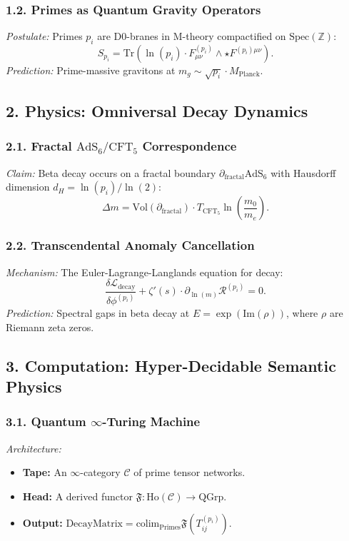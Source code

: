 \documentclass{article}
\theoremstyle{plain}
\newcommand{\Spec}{\text{Spec}}
\newcommand{\Ho}{\text{Ho}}
\newcommand{\QGrp}{\text{QGrp}}
\newcommand{\Tr}{\text{Tr}}
\newcommand{\colim}{\text{colim}}
\newcommand{\Vol}{\text{Vol}}
\newcommand{\DecayMatrix}{\text{DecayMatrix}}
\newcommand{\AdS}{\text{AdS}}
\newcommand{\CFT}{\text{CFT}}
\begin{document}
\subsubsection*{1.2. Primes as Quantum Gravity Operators}
\emph{Postulate:} Primes $p_i$ are D0-branes in M-theory compactified on $\Spec(\mathbb{Z})$:
\begin{equation}
S_{p_i} = \Tr\left(\ln(p_i) \cdot F_{\mu\nu}^{(p_i)} \wedge \star F^{(p_i)\mu\nu}\right).
\end{equation}
\emph{Prediction:} Prime-massive gravitons at $m_g \sim \sqrt{p_i} \cdot M_{\text{Planck}}$.

\subsection*{2. Physics: Omniversal Decay Dynamics}
\subsubsection*{2.1. Fractal $\AdS_6/\CFT_5$ Correspondence}
\emph{Claim:} Beta decay occurs on a fractal boundary $\partial_{\text{fractal}}\AdS_6$ with Hausdorff dimension $d_H = \ln(p_i)/\ln(2)$:
\begin{equation}
\Delta m = \Vol(\partial_{\text{fractal}}) \cdot T_{\CFT_5} \ln\left(\frac{m_0}{m_e}\right).
\end{equation}

\subsubsection*{2.2. Transcendental Anomaly Cancellation}
\emph{Mechanism:} The Euler-Lagrange-Langlands equation for decay:
\begin{equation}
\frac{\delta \mathcal{L}_{\text{decay}}}{\delta \phi^{(p_i)}} + \zeta'(s) \cdot \partial_{\ln(m)} \mathcal{R}^{(p_i)} = 0.
\end{equation}
\emph{Prediction:} Spectral gaps in beta decay at $E = \exp(\text{Im}(\rho))$, where $\rho$ are Riemann zeta zeros.

\subsection*{3. Computation: Hyper-Decidable Semantic Physics}
\subsubsection*{3.1. Quantum $\infty$-Turing Machine}
\emph{Architecture:}
\begin{itemize}
\item \textbf{Tape:} An $\infty$-category $\mathcal{C}$ of prime tensor networks.
\item \textbf{Head:} A derived functor $\mathfrak{F}: \Ho(\mathcal{C}) \to \QGrp$.
\item \textbf{Output:} $\DecayMatrix = \colim_{\text{Primes}} \mathfrak{F}(T_{ij}^{(p_i)})$.
\end{itemize}
\end{document}
